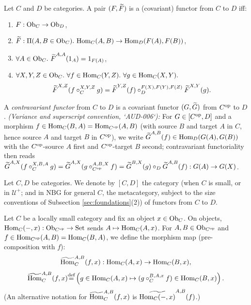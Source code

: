 \documentclass[10pt,a4paper]{article}
\begin{document}
\begin{definition}\label{def:functor}
Let $C$ and $D$ be categories. A pair $(F, {\widetilde{F}\textrm{}})$ is a (covariant) functor from $C$ to $D$ iff:
\begin{enumerate}
\item $F : {\textrm{Ob}}_C \to {\textrm{Ob}}_D$,
\item $\FMor : \Pi(A, B \in \Ob_C).\ \Hom_C(A,B) \to \Hom_D(F(A), F(B))$,
\item $\forall A\in \Ob_C.\ \FMor^{A,A}(1_A)=1_{F(A)}$,
\item $\forall X,Y,Z \in {\textrm{Ob}}_C.\ \forall f\in{\textrm{Hom}}_C(Y,Z).\ \forall g\in{\textrm{Hom}}_C(X,Y).$
$${\widetilde{F}\textrm{}}^{X,Z}(f\circ_C^{X,Y,Z} g)={\widetilde{F}\textrm{}}^{Y,Z}(f)\circ_D^{F(X),F(Y),F(Z)} {\widetilde{F}\textrm{}}^{X,Y}(g).$$
\end{enumerate}
A \emph{contravariant functor} from $C$ to $D$ is a covariant functor $(G, {\widetilde{G}\textrm{}})$ from $C^{\textrm{op}}$ to $D$. \emph{(Variance and superscript convention, `AUD-006`):} For $G \in [C^{\textrm{op}}, D]$ and a morphism $f \in {\textrm{Hom}}_C(B, A) = {\textrm{Hom}}_{C^{\textrm{op}}}(A, B)$ (with source $B$ and target $A$ in $C$, hence source $A$ and target $B$ in $C^{\textrm{op}}$), we write ${\widetilde{G}\textrm{}}^{A,B}(f) \in {\textrm{Hom}}_D(G(A), G(B))$ with the $C^{\textrm{op}}$-source $A$ first and $C^{\textrm{op}}$-target $B$ second; contravariant functoriality then reads ${\widetilde{G}\textrm{}}^{A,X}(f \circ_C^{X,B,A} g) = {\widetilde{G}\textrm{}}^{A,X}(g \circ_{C^{\textrm{op}}}^{A,B,X} f) = {\widetilde{G}\textrm{}}^{B,X}(g) \circ_D {\widetilde{G}\textrm{}}^{A,B}(f) : G(A) \to G(X)$.
\end{definition}

\begin{definition}\label{def:fun_class}
Let $C, D$ be categories. We denote by $[C,D]$ the category (when $C$ is small, or in $\mathcal{U}^+$; and in $\mathrm{NBG}$ for general $C$, the metacategory, subject to the size conventions of Subsection \ref{sec:foundations}(2)) of functors from $C$ to $D$.
\end{definition}

\begin{definition}\label{def:hommor}
Let $C$ be a locally small category and fix an object $x \in {\textrm{Ob}}_C$. On objects, ${\textrm{Hom}}_C(-,x) : {\textrm{Ob}}_{C^{\textrm{op}}} \to {\textrm{Set}}$ sends $A \mapsto {\textrm{Hom}}_C(A,x)$.
For $A,B \in {\textrm{Ob}}_{C^{\textrm{op}}}$ and $f \in {\textrm{Hom}}_{C^{\textrm{op}}}(A,B) = {\textrm{Hom}}_C(B,A)$, we define the morphism map (pre-composition with $f$):
$${\widetilde{{\textrm{Hom}}}\textrm{}}^{A,B}_C(f,x) : {\textrm{Hom}}_C(A,x) \to {\textrm{Hom}}_C(B,x),$$
$${\widetilde{{\textrm{Hom}}}\textrm{}}^{A,B}_C(f,x) {\stackrel{{\textrm{def}}}{=}} \left(g \in {\textrm{Hom}}_C(A,x) \mapsto (g \circ_C^{B,A,x} f) \in {\textrm{Hom}}_C(B,x)\right).$$
(An alternative notation for ${\widetilde{{\textrm{Hom}}}\textrm{}}^{A,B}_C(f,x)$ is $\widetilde{{\textrm{Hom}}_C(-,x)}^{A,B}(f)$.)
\end{definition}
\end{document}
